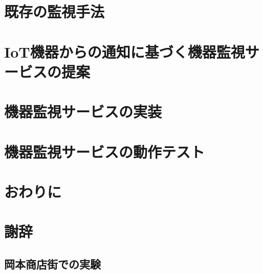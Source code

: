 \documentclass[a4paper]{jreport}
\begin{document}
\chapter{既存の監視手法}

\chapter{IoT機器からの通知に基づく機器監視サービスの提案}

\chapter{機器監視サービスの実装}

\chapter{機器監視サービスの動作テスト}


\chapter{おわりに}


\chapter{謝辞}




\appendix
\section{岡本商店街での実験}

%
\end{document}
